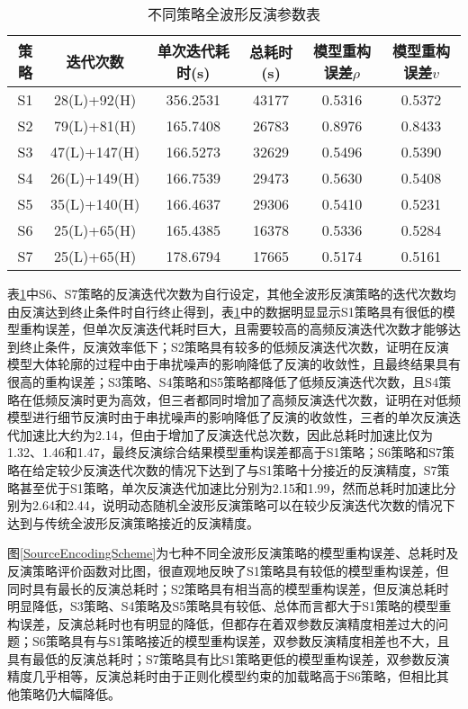 \documentclass[12pt]{article}
\begin{document}
\begin{table}[H]
\centering
\caption{不同策略全波形反演参数表}\label{SourceEncodingTab}
\renewcommand\tabcolsep{0.25em}
\begin{tabular}{cccccc}
\toprule
{策略} & {迭代次数}  & {单次迭代耗时(s)} & {总耗时(s)} & {模型重构误差$\rho$} & {模型重构误差$v$} \\
\midrule 
S1 & 28(L)+92(H) & 356.2531 & 43177 & 0.5316 & 0.5372\\
S2 & 79(L)+81(H) & 165.7408 & 26783 & 0.8976 & 0.8433\\
S3 & 47(L)+147(H) & 166.5273 & 32629 & 0.5496 & 0.5390\\
S4 & 26(L)+149(H) & 166.7539 & 29473 & 0.5630 & 0.5408\\
S5 & 35(L)+140(H) & 166.4637 & 29306 & 0.5410 & 0.5231\\
S6 & 25(L)+65(H) & 165.4385 & 16378 & 0.5336 & 0.5284\\
S7 & 25(L)+65(H) & 178.6794 & 17665 & 0.5174 & 0.5161\\
\bottomrule
\end{tabular}
\end{table}
\par
表\ref{SourceEncodingTab}中S6、S7策略的反演迭代次数为自行设定，其他全波形反演策略的迭代次数均由反演达到终止条件时自行终止得到，表\ref{SourceEncodingTab}中的数据明显显示S1策略具有很低的模型重构误差，但单次反演迭代耗时巨大，且需要较高的高频反演迭代次数才能够达到终止条件，反演效率低下；S2策略具有较多的低频反演迭代次数，证明在反演模型大体轮廓的过程中由于串扰噪声的影响降低了反演的收敛性，且最终结果具有很高的重构误差；S3策略、S4策略和S5策略都降低了低频反演迭代次数，且S4策略在低频反演时更为高效，但三者都同时增加了高频反演迭代次数，证明在对低频模型进行细节反演时由于串扰噪声的影响降低了反演的收敛性，三者的单次反演迭代加速比大约为2.14，但由于增加了反演迭代总次数，因此总耗时加速比仅为1.32、1.46和1.47，最终反演综合结果模型重构误差都高于S1策略；S6策略和S7策略在给定较少反演迭代次数的情况下达到了与S1策略十分接近的反演精度，S7策略甚至优于S1策略，单次反演迭代加速比分别为2.15和1.99，然而总耗时加速比分别为2.64和2.44，说明动态随机全波形反演策略可以在较少反演迭代次数的情况下达到与传统全波形反演策略接近的反演精度。
\par
图\ref{SourceEncodingScheme}为七种不同全波形反演策略的模型重构误差、总耗时及反演策略评价函数对比图，很直观地反映了S1策略具有较低的模型重构误差，但同时具有最长的反演总耗时；S2策略具有相当高的模型重构误差，但反演总耗时明显降低，S3策略、S4策略及S5策略具有较低、总体而言都大于S1策略的模型重构误差，反演总耗时也有明显的降低，但都存在着双参数反演精度相差过大的问题；S6策略具有与S1策略接近的模型重构误差，双参数反演精度相差也不大，且具有最低的反演总耗时；S7策略具有比S1策略更低的模型重构误差，双参数反演精度几乎相等，反演总耗时由于正则化模型约束的加载略高于S6策略，但相比其他策略仍大幅降低。
\end{document}
